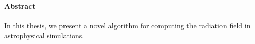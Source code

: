 \thispagestyle{fancy}

\textrm{}\\\\
\noindent\textbf{\huge\textsf{Abstract}}\\\\

\noindent In this thesis, we present a novel algorithm for computing the radiation field in astrophysical simulations.


\newpage
\thispagestyle{empty}
\mbox{}

